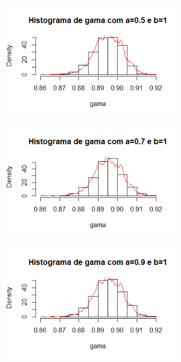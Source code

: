 \documentclass{article}
\begin{document}
				\begin{figure}[H]
					 \begin{subfigure}[h]{0.6\textwidth}
   						 \includegraphics[width=\textwidth]{a0-5b1-0}
 					 \end{subfigure}
 					 \begin{subfigure}[h]{0.6\textwidth}
   						 \includegraphics[width=\textwidth]{a0-7b1-0}
 					 \end{subfigure}
 					 \begin{subfigure}[h]{0.6\textwidth}
   						 \includegraphics[width=\textwidth]{a0-9b1-0}

\end{subfigure}
\end{figure}
\end{document}
